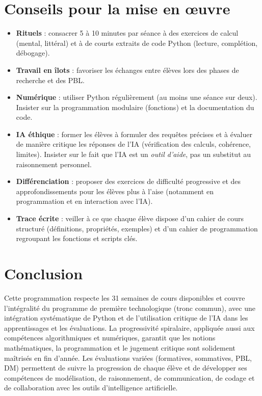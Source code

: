 \documentclass[a4paper,12pt]{article}
\begin{document}
	\section{Conseils pour la mise en œuvre}
	\begin{itemize}
		\item \textbf{Rituels} : consacrer 5 à 10 minutes par séance à des exercices de calcul (mental, littéral) et à de courts extraits de code Python (lecture, complétion, débogage).
		\item \textbf{Travail en îlots} : favoriser les échanges entre élèves lors des phases de recherche et des PBL.
		\item \textbf{Numérique} : utiliser Python régulièrement (au moins une séance sur deux). Insister sur la programmation modulaire (fonctions) et la documentation du code.
		\item \textbf{IA éthique} : former les élèves à formuler des requêtes précises et à évaluer de manière critique les réponses de l’IA (vérification des calculs, cohérence, limites). Insister sur le fait que l’IA est un \emph{outil d’aide}, pas un substitut au raisonnement personnel.
		\item \textbf{Différenciation} : proposer des exercices de difficulté progressive et des approfondissements pour les élèves plus à l’aise (notamment en programmation et en interaction avec l’IA).
		\item \textbf{Trace écrite} : veiller à ce que chaque élève dispose d’un cahier de cours structuré (définitions, propriétés, exemples) et d’un cahier de programmation regroupant les fonctions et scripts clés.
	\end{itemize}
	
	\section*{Conclusion}
	Cette programmation respecte les 31 semaines de cours disponibles et couvre l’intégralité du programme de première technologique (tronc commun), avec une intégration systématique de Python et de l’utilisation critique de l’IA dans les apprentissages et les évaluations. La progressivité spiralaire, appliquée aussi aux compétences algorithmiques et numériques, garantit que les notions mathématiques, la programmation et le jugement critique sont solidement maîtrisés en fin d’année. Les évaluations variées (formatives, sommatives, PBL, DM) permettent de suivre la progression de chaque élève et de développer ses compétences de modélisation, de raisonnement, de communication, de codage et de collaboration avec les outils d’intelligence artificielle.
	
\end{document}

